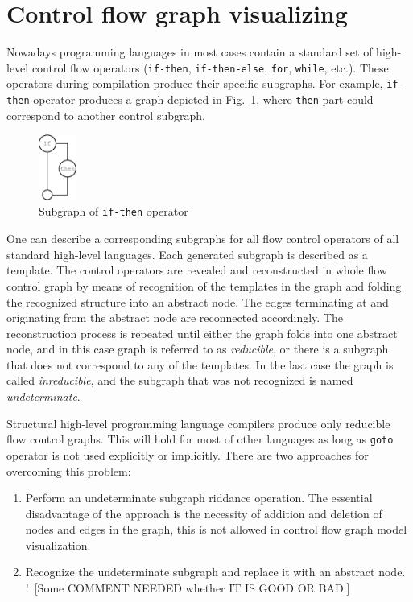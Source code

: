 \documentclass[conference]{IEEEtran}
\newcommand{\nnn}[2][ncolor]{\noindent%
\textcolor{eclr}{!\ [}\textcolor{#1}{#2}\textcolor{eclr}{]}}
\begin{document}
\section{Control flow graph visualizing}
\label{sec:cfg-vis}

Nowadays programming languages in most cases contain a standard set of high-level control flow operators (\texttt{if-then}, \texttt{if-then-else}, \texttt{for}, \texttt{while}, etc.).  These operators during compilation produce their specific subgraphs.  For example, \texttt{if-then} operator produces a graph depicted in Fig.~\ref{fig:IfSt}, where \texttt{then} part could correspond to another control subgraph.
\begin{figure}[htbp]
	\centering
		\includegraphics[width=0.11\textwidth]{Pic/Pic2.eps}
	\caption{Subgraph of \texttt{if-then} operator}
	\label{fig:IfSt}
\end{figure}

One can describe a corresponding subgraphs for all flow control operators of all standard high-level languages.  Each generated subgraph is described as a template.  The control operators are revealed and reconstructed in whole flow control graph by means of recognition of the templates in the graph and folding the recognized structure into an abstract node.  The edges terminating at and originating from the abstract node are reconnected accordingly.  The reconstruction process is repeated until either the graph folds into one abstract node, and in this case graph is referred to as \emph{reducible}, or there is a subgraph that does not correspond to any of the templates.  In the last case the graph is called \emph{inreducible}, and the subgraph that was not recognized is named \emph{undeterminate}.

Structural high-level programming language compilers produce only reducible flow control graphs.  This will hold for most of other languages as long as \texttt{goto} operator is not used explicitly or implicitly.  There are two approaches for overcoming this problem:
\begin{enumerate}
\item Perform an undeterminate subgraph riddance operation.  The essential disadvantage of the approach is the necessity of addition and deletion of nodes and edges in the graph, this is not allowed in control flow graph model visualization.
\item Recognize the undeterminate subgraph and replace it with an abstract node.  \nnn{Some COMMENT NEEDED whether IT IS GOOD OR BAD.}
\end{enumerate}
\end{document}
